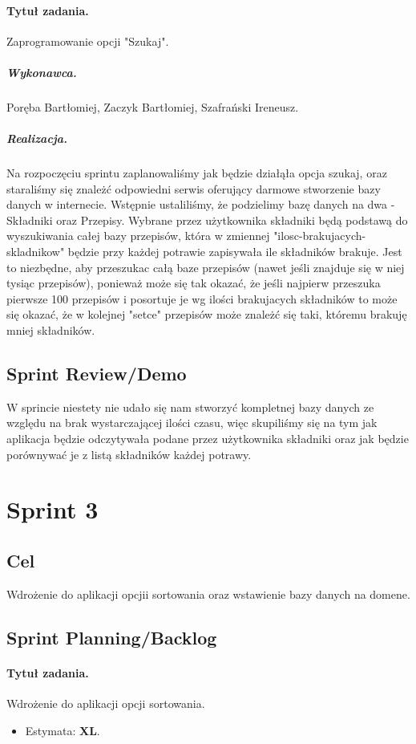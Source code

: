 \documentclass[a4paper]{article}
\begin{document}
	
	\paragraph{Tytuł zadania.} Zaprogramowanie opcji "Szukaj".
	\subparagraph{Wykonawca.} Poręba Bartłomiej, Zaczyk Bartłomiej, Szafrański Ireneusz.
	\subparagraph{Realizacja.}
	Na rozpoczęciu sprintu zaplanowaliśmy jak będzie działąła opcja szukaj, oraz staraliśmy się znależć odpowiedni serwis oferujący darmowe stworzenie bazy danych w internecie. Wstępnie ustaliliśmy, że podzielimy bazę danych na dwa - Składniki oraz Przepisy. Wybrane przez użytkownika składniki będą podstawą do wyszukiwania całej bazy przepisów, która w zmiennej "ilosc-brakujacych-skladnikow" będzie przy każdej potrawie zapisywała ile składników brakuje. Jest to niezbędne, aby przeszukac całą baze przepisów (nawet jeśli znajduje się w niej tysiąc przepisów), ponieważ może się tak okazać, że jeśli najpierw przeszuka pierwsze 100 przepisów i posortuje je wg ilości brakujacych składników to może się okazać, że w kolejnej "setce" przepisów może znależć się taki, któremu brakuję mniej składników.
	
	
	
	\subsection{Sprint Review/Demo}
	W sprincie niestety nie udało się nam stworzyć kompletnej bazy danych ze względu na brak wystarczającej ilości czasu, więc skupiliśmy się na tym jak aplikacja będzie odczytywała podane przez użytkownika składniki oraz jak będzie porównywać je z listą składników każdej potrawy.
	
	
	\section{Sprint 3}
	
	\subsection{Cel} Wdrożenie do aplikacji opcjii sortowania oraz wstawienie bazy danych na domene.
	
	\subsection{Sprint Planning/Backlog}
	
	\paragraph{Tytuł zadania.} Wdrożenie do aplikacji opcji sortowania.
	\begin{itemize}
		\item Estymata: \textbf{XL}.
	\end{itemize}
	
\end{document}
